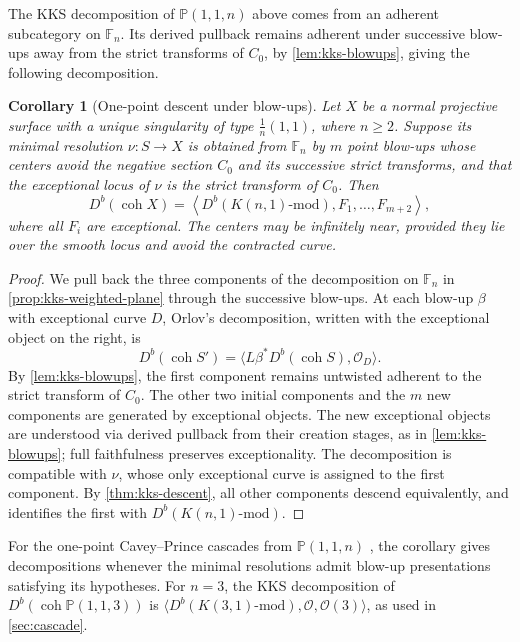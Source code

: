 \documentclass[11pt]{article}
\theoremstyle{plain}
\newtheorem{corollary}[corollary]{Corollary}
\theoremstyle{definition}
\theoremstyle{remark}
\newcommand{\Pp}{\mathbb P}
\newcommand{\F}{\mathbb F}
\newcommand{\Db}{D^b}
\newcommand{\coh}{\operatorname{coh}}
\newcommand{\OO}{\mathcal O}
\begin{document}
The KKS decomposition of \(\Pp(1,1,n)\) above comes from an adherent
subcategory on \(\F_n\). Its derived pullback remains adherent under
successive blow-ups away from the strict transforms of \(C_0\), by
\cref{lem:kks-blowups}, giving the following decomposition.

\begin{corollary}[One-point descent under blow-ups]
\label{cor:cyclic-one-point-kks-sod}
Let \(X\) be a normal projective surface with a unique singularity
of type \(\frac1n(1,1)\), where \(n\geq2\). Suppose its minimal
resolution \(\nu:S\to X\) is obtained from \(\F_n\) by \(m\)
point blow-ups whose centers avoid the negative section \(C_0\)
and its successive strict transforms, and that the exceptional locus
of \(\nu\) is the strict transform of \(C_0\).
Then
\[
\Db(\coh X)=\left\langle
\Db(K(n,1)\text{-mod}),F_1,\ldots,F_{m+2}
\right\rangle,
\]
where all \(F_i\) are exceptional. The centers may be infinitely near,
provided they lie over the smooth locus and avoid the contracted curve.
\end{corollary}

\begin{proof}
We pull back the three components of the decomposition on \(\F_n\)
in \cref{prop:kks-weighted-plane} through the successive blow-ups.
At each blow-up \(\beta\) with exceptional curve \(D\),
Orlov's decomposition, written with the exceptional object on the right, is
\[
\Db(\coh S')=\langle L\beta^*\Db(\coh S),\OO_D\rangle.
\]
By \cref{lem:kks-blowups}, the first component remains untwisted adherent
to the strict transform of \(C_0\). The other two initial components
and the \(m\) new components are generated by exceptional objects. The
new exceptional objects are understood via derived pullback from their
creation stages, as in \cref{lem:kks-blowups}; full faithfulness preserves
exceptionality. The decomposition
is compatible with \(\nu\), whose only exceptional curve is assigned
to the first component. By \cref{thm:kks-descent}, all other components descend
equivalently, and \cite[Theorem~3.16]{KKS2020} identifies the first
with \(\Db(K(n,1)\text{-mod})\).
\end{proof}

For the one-point Cavey--Prince cascades from \(\Pp(1,1,n)\)
\cite{CAVEY2020}, the corollary gives decompositions whenever the minimal
resolutions admit blow-up presentations satisfying its hypotheses.
For \(n=3\), the KKS decomposition of \(\Db(\coh\Pp(1,1,3))\) is
\(\langle\Db(K(3,1)\text{-mod}),\OO,\OO(3)\rangle\), as used in
\cref{sec:cascade}.
\end{document}
